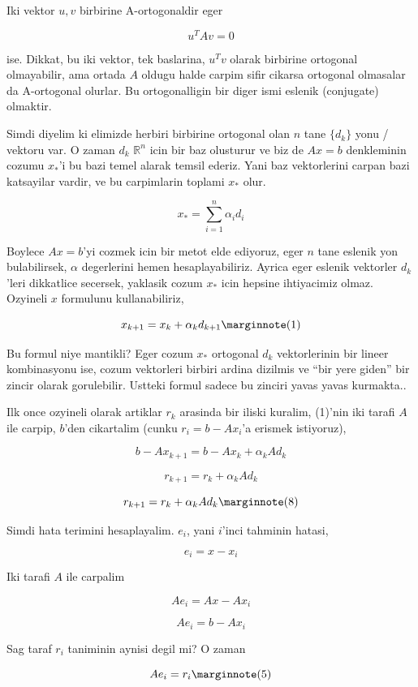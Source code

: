 \documentclass[12pt,fleqn]{article}\usepackage{../common}
\begin{document}
Iki vektor $u,v$ birbirine A-ortogonaldir eger

\[ u^TAv = 0 \] 

ise. Dikkat, bu iki vektor, tek baslarina, $u^Tv$ olarak birbirine
ortogonal olmayabilir, ama ortada $A$ oldugu halde carpim sifir cikarsa
ortogonal olmasalar da A-ortogonal olurlar. Bu ortogonalligin bir diger
ismi eslenik (conjugate) olmaktir.

Simdi diyelim ki elimizde herbiri birbirine ortogonal olan $n$ tane
$\{d_k\}$ yonu / vektoru var. O zaman $d_k$ $\mathbb{R}^n$ icin bir baz
olusturur ve biz de $Ax = b$ denkleminin cozumu $x_*$'i bu bazi temel
alarak temsil ederiz. Yani baz vektorlerini carpan bazi katsayilar vardir,
ve bu carpimlarin toplami $x_*$ olur. 

\[ x_* = \sum _{ i=1}^{n} \alpha_i d_i \]

Boylece $Ax = b$'yi cozmek icin bir metot elde ediyoruz, eger $n$ tane
eslenik yon bulabilirsek, $\alpha$ degerlerini hemen hesaplayabiliriz.
Ayrica eger eslenik vektorler $d_k$'leri dikkatlice secersek, yaklasik cozum $x_*$
icin hepsine ihtiyacimiz olmaz. Ozyineli $x$ formulunu kullanabiliriz,

\[
x_{k+1} = x_k + \alpha_k d_{k+1}
\mlabel{1}
\]

Bu formul niye mantikli? Eger cozum $x_*$ ortogonal $d_k$ vektorlerinin bir
lineer kombinasyonu ise, cozum vektorleri birbiri ardina dizilmis ve ``bir
yere giden'' bir zincir olarak gorulebilir. Ustteki formul sadece bu
zinciri yavas yavas kurmakta..

Ilk once ozyineli olarak artiklar $r_k$ arasinda bir iliski kuralim,
(1)'nin iki tarafi $A$ ile carpip, $b$'den cikartalim (cunku
$r_i = b -
Ax_i$'a erismek istiyoruz),

\[b - A x_{k+1} = b - A x_k  + \alpha_k A d_{k} \]

\[r_{k+1} = r_k + \alpha_k A d_{k} \]

\[
r_{k+1} = r_k + \alpha_k A d_{k} 
\mlabel{8}
\]

Simdi hata terimini hesaplayalim. $e_i$, yani $i$'inci tahminin hatasi, 

\[ e_i = x - x_i  \]

Iki tarafi $A$ ile carpalim

\[ Ae_i = Ax - Ax_i  \]

\[ Ae_i = b - Ax_i  \]

Sag taraf $r_i$ taniminin aynisi degil mi? O zaman 

\[
Ae_i = r_i 
\mlabel{5}
\]
\end{document}

